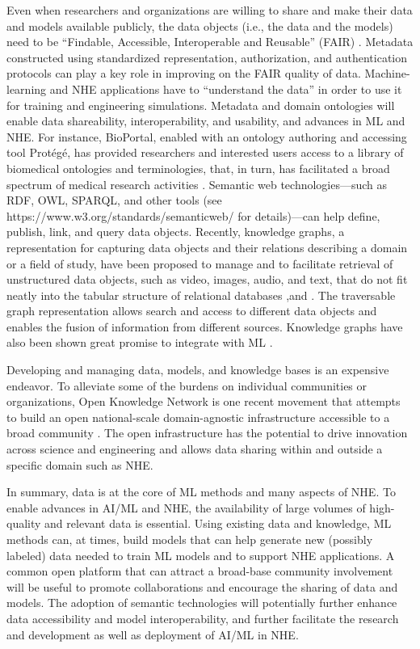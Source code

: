Even when researchers and organizations are willing to share and make their data and models available publicly, the data objects (i.e., the data and the models) need to be ``Findable, Accessible, Interoperable and Reusable'' (FAIR) \citep{wilkinson2016fair}. Metadata constructed using standardized representation, authorization, and authentication protocols can play a key role in improving on the FAIR quality of data. Machine-learning and NHE applications have to ``understand the data'' in order to use it for training and engineering simulations. Metadata and domain ontologies will enable data shareability, interoperability, and usability, and advances in ML and NHE. For instance, BioPortal, enabled with an ontology authoring and accessing tool Protégé, has provided researchers and interested users access to a library of biomedical ontologies and terminologies, that, in turn, has facilitated a broad spectrum of medical research activities \citep{whetzel2011bioportal}. Semantic web technologies---such as RDF, OWL, SPARQL, and other tools (see https://www.w3.org/standards/semanticweb/ for details)---can help define, publish, link, and query data objects. Recently, knowledge graphs, a representation for capturing data objects and their relations describing a domain or a field of study, have been proposed to manage and to facilitate retrieval of unstructured data objects, such as video, images, audio, and text, that do not fit neatly into the tabular structure of relational databases \citep{paulheim2016knowledge,bonatti2018knowledge},and \citep{reinanda2020knowledge}. The traversable graph representation allows search and access to different data objects and enables the fusion of information from different sources. Knowledge graphs have also been shown great promise to integrate with ML \citep{lin2018multihop}.

Developing and managing data, models, and knowledge bases is an expensive endeavor. To alleviate some of the burdens on individual communities or organizations, Open Knowledge Network is one recent movement that attempts to build an open national-scale domain-agnostic infrastructure accessible to a broad community \citep{baru2017open}. The open infrastructure has the potential to drive innovation across science and engineering and allows data sharing within and outside a specific domain such as NHE.

In summary, data is at the core of ML methods and many aspects of NHE. To enable advances in AI/ML and NHE, the availability of large volumes of high-quality and relevant data is essential. Using existing data and knowledge, ML methods can, at times, build models that can help generate new (possibly labeled) data needed to train ML models and to support NHE applications. A common open platform that can attract a broad-base community involvement will be useful to promote collaborations and encourage the sharing of data and models. The adoption of semantic technologies will potentially further enhance data accessibility and model interoperability, and further facilitate the research and development as well as deployment of AI/ML in NHE. 

